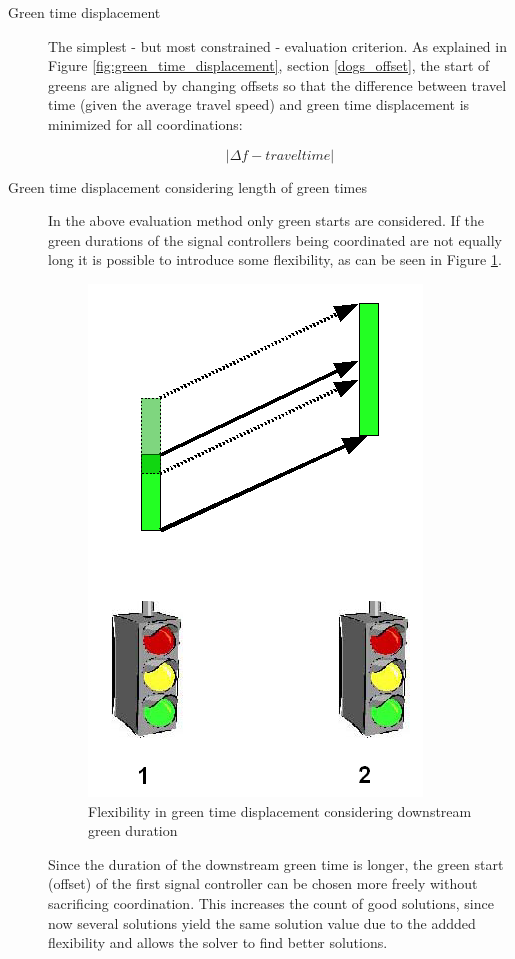 \begin{description}
\item[Green time displacement]
The simplest - but most constrained - evaluation criterion. As explained in Figure \ref{fig:green_time_displacement}, section \ref{dogs_offset}, the start of greens are aligned by changing offsets so that the difference between travel time (given the average travel speed) and green time displacement is minimized for all coordinations:

$$|\Delta f - traveltime|$$

\item[Green time displacement considering length of green times]
In the above evaluation method only green starts are considered. If the green durations of the signal controllers being coordinated are not equally long it is possible to introduce some flexibility, as can be seen in Figure \ref{fig:green_time_displacement_flex}.

\begin{figure}[htbp]
\centering
\includegraphics[scale=0.4]{green_time_displacement_flex.png}
\caption{Flexibility in green time displacement considering downstream green duration}
\label{fig:green_time_displacement_flex}
\end{figure}

Since the duration of the downstream green time is longer, the green start (offset) of the first signal controller can be chosen more freely without sacrificing coordination. This increases the count of good solutions, since now several solutions yield the same solution value due to the addded flexibility and allows the solver to find better solutions.


\end{description}
